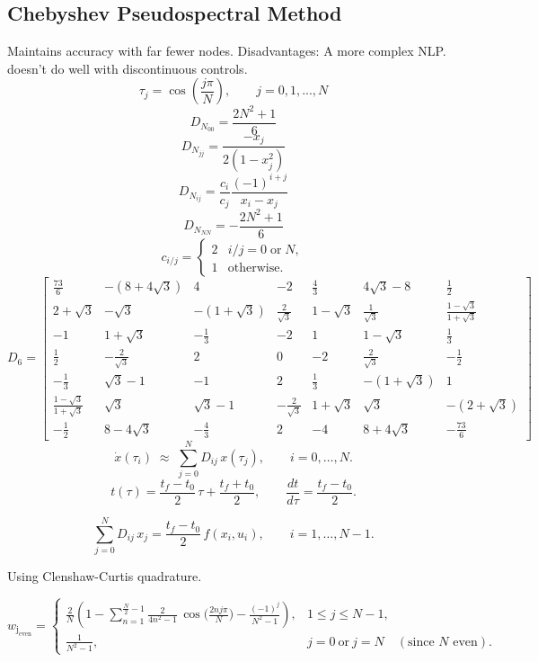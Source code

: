 \documentclass[]{article}
\begin{document}
\subsection*{Chebyshev Pseudospectral Method}
Maintains accuracy with far fewer nodes.  Disadvantages: A more complex NLP. doesn't do well with discontinuous controls.
	\[
        \tau_j = \cos{(\frac{j\pi}{N})},\qquad j = 0,1,...,N
        \]
	\[
       D_{N_{00}}=\frac{2N^2+1}{6}
        \]
	\[
       D_{N_{jj}}=\frac{-x_j}{2(1-x_j^2)}
        \]
	\[
       D_{N_{ij}}=\frac{c_i}{c_j}\frac{(-1)^{i+j}}{x_i-x_j}
        \]
	\[
       D_{N_{NN}}=-\frac{2N^2+1}{6}
        \]
	\[
        c_{i/j}=
        \begin{cases}
        2 & i/j = 0 \;\text{or}\; N, \\
        1 & \text{otherwise}.
        \end{cases}
        \]
        \[
        D_{6} =
        \begin{bmatrix}
        \frac{73}{6} & -(8+4\sqrt{3})  & 4 & -2 & \frac{4}{3} & 4\sqrt{3} - 8 & \frac{1}{2}\\
        2+\sqrt{3} & -\sqrt{3} & -(1+\sqrt{3}) & \frac{2}{\sqrt{3}} & 1-\sqrt{3} & \frac{1}{\sqrt{3}} & \frac{1-\sqrt{3}}{1+\sqrt{3}}\\
        -1 & 1+\sqrt{3} & -\frac{1}{3} & -2 & 1 & 1-\sqrt{3} & \frac{1}{3}\\
        \frac{1}{2} & -\frac{2}{\sqrt{3}} & 2 & 0 & -2 & \frac{2}{\sqrt{3}} & -\frac{1}{2}\\
        -\frac{1}{3} & \sqrt{3}-1 & -1 & 2 & \frac{1}{3} & -(1+\sqrt{3}) & 1\\
        \frac{1-\sqrt{3}}{1+\sqrt{3}} & \sqrt{3} & \sqrt{3}-1 & -\frac{2}{\sqrt{3}} & 1+\sqrt{3} & \sqrt{3} &-( 2+\sqrt{3})\\
        -\frac{1}{2} & 8-4\sqrt{3} & -\frac{4}{3} & 2 & -4 & 8+4\sqrt{3} &  -\frac{73}{6}
        \end{bmatrix}
        \]
        \[
        \dot{x}(\tau_i) \;\approx\; \sum_{j=0}^N D_{ij}\,x(\tau_j), 
        \qquad i=0,\dots,N.
        \]
        \[
        t(\tau) = \frac{t_f-t_0}{2}\,\tau + \frac{t_f+t_0}{2}, 
        \qquad 
        \frac{dt}{d\tau} = \frac{t_f-t_0}{2}.
        \]
        
        \[
        \sum_{j=0}^N D_{ij}\,x_j 
        = \frac{t_f-t_0}{2}\, f(x_i,u_i), 
        \qquad i=1,\dots,N-1.
        \]
        
        Using Clenshaw-Curtis quadrature.

        \[
        w_{\mathrm{j_{even}}} =
        \begin{cases}
        \displaystyle
        \frac{2}{N}\!\left(
        1 - \sum_{n=1}^{\frac{N}{2}-1} \frac{2}{4n^{2}-1}\,
        \cos\!\Big(\tfrac{2 n j \pi}{N}\Big)
        -\frac{(-1)^{j}}{N^{2}-1}
        \right), & 1 \le j \le N-1, \\[2.0ex]
        \displaystyle \frac{1}{N^{2}-1}, & j=0\ \text{or}\ j=N \quad(\text{since \(N\) even}).
        \end{cases}
        \]
\end{document}
